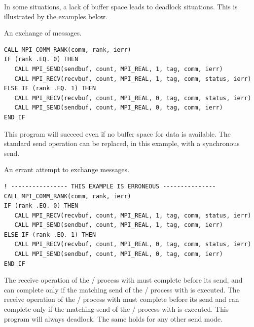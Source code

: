 In some situations, a lack of buffer space leads to deadlock situations.
This is illustrated by the examples below.

\begin{example}
\label{pt2pt-exG}
%
%
An exchange of messages.

\begin{lstlisting}[language={[MPI]Fortran}]
CALL MPI_COMM_RANK(comm, rank, ierr)
IF (rank .EQ. 0) THEN
   CALL MPI_SEND(sendbuf, count, MPI_REAL, 1, tag, comm, ierr)
   CALL MPI_RECV(recvbuf, count, MPI_REAL, 1, tag, comm, status, ierr)
ELSE IF (rank .EQ. 1) THEN
   CALL MPI_RECV(recvbuf, count, MPI_REAL, 0, tag, comm, status, ierr)
   CALL MPI_SEND(sendbuf, count, MPI_REAL, 0, tag, comm, ierr)
END IF
\end{lstlisting}
This program will succeed even if no buffer space for data
is available.  The standard send operation can be replaced, in this example,
with a synchronous send.
\end{example}

\begin{example}
\label{pt2pt-exH}
%
%
An errant attempt to exchange messages.
\begin{lstlisting}[language={[MPI]Fortran}]
! ---------------- THIS EXAMPLE IS ERRONEOUS ---------------
CALL MPI_COMM_RANK(comm, rank, ierr)
IF (rank .EQ. 0) THEN
   CALL MPI_RECV(recvbuf, count, MPI_REAL, 1, tag, comm, status, ierr)
   CALL MPI_SEND(sendbuf, count, MPI_REAL, 1, tag, comm, ierr)
ELSE IF (rank .EQ. 1) THEN
   CALL MPI_RECV(recvbuf, count, MPI_REAL, 0, tag, comm, status, ierr)
   CALL MPI_SEND(sendbuf, count, MPI_REAL, 0, tag, comm, ierr)
END IF
\end{lstlisting}
The receive operation of the \MPI/ process with  must complete before its send, and
can complete only if the matching send
of the \MPI/ process with  is executed. The receive operation of the
\MPI/ process with  must complete before its send and
can complete only if the matching send of the \MPI/ process with  is executed.
This program will always deadlock.  The same holds for any other send mode.
\end{example}

